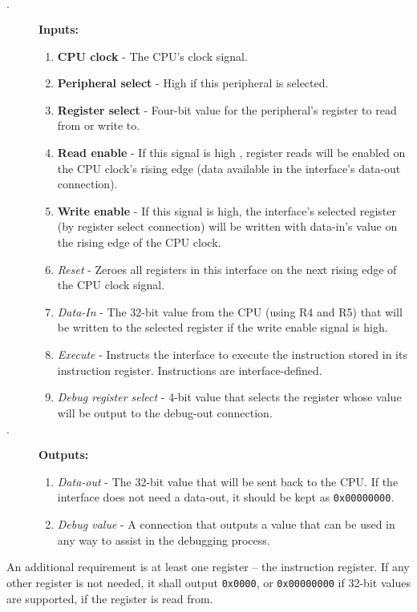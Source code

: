\documentclass{article}
\begin{document}
			\begin{description}
				\item[$\cdot$] \textbf{Inputs:}
				\begin{enumerate}
					\item \textbf{CPU clock} - The CPU's clock signal.
					\item \textbf{Peripheral select} - High if this peripheral is selected.
					\item \textbf{Register select} - Four-bit value for the peripheral's register to read from or write to.
					\item \textbf{Read enable} - If this signal is high , register reads will be enabled on the CPU clock's rising edge (data available in the interface's data-out connection).
					\item \textbf{Write enable} - If this signal is high, the interface's selected register (by register select connection) will be written with data-in's value on the rising edge of the CPU clock.
					\item \textit{Reset} - Zeroes all registers in this interface on the next rising edge of the CPU clock signal.
					\item \textit{Data-In} - The 32-bit value from the CPU (using R4 and R5) that will be written to the selected register if the write enable signal is high.
					\item \textit{Execute} - Instructs the interface to execute the instruction stored in its instruction register. Instructions are interface-defined.
					\item \textit{Debug register select} - 4-bit value that selects the register whose value will be output to the debug-out connection.
				\end{enumerate}
				\item[$\cdot$] \textbf{Outputs:}
				\begin{enumerate}
					\item \textit{Data-out} - The 32-bit value that will be sent back to the CPU. If the interface does not need a data-out, it should be kept as \texttt{0x00000000}.
					\item \textit{Debug value} - A connection that outputs a value that can be used in any way to assist in the debugging process.
				\end{enumerate}
			\end{description}
		
			An additional requirement is at least one register -- the instruction register. If any other register is not needed, it shall output \texttt{0x0000}, or \texttt{0x00000000} if 32-bit values are supported, if the register is read from.
\end{document}
